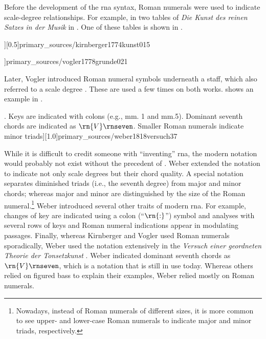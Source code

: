 
Before the development of the \gls{rna} syntax, Roman
numerals were used to indicate scale-degree relationships.
For example, in two tables of \emph{Die Kunst des reinen
Satzes in der Musik} in \textcite{kirnberger1774kunst}. One
of these tables is shown in
.

\phdfigure[Roman numerals in \textcite[p.
15]{kirnberger1774kunst}][0.5]{primary_sources/kirnberger1774kunst015}
 
\phdfigure[Roman numerals in
\textcite[Tab~XXI]{vogler1778grunde}]{primary_sources/vogler1778grunde021}

Later, Vogler introduced Roman numeral symbols underneath a
staff, which also referred to a scale degree
\parencite{vogler1778grunde, vogler1802handbuch}. These are
used a few times on both works.
 shows an
example in \textcite{vogler1778grunde}.

\phdfigure[Roman numerals in
\textcite[p.~37]{weber1818versuch}. Keys are indicated with
colons (e.g., mm. 1 and mm.5). Dominant seventh chords are
indicated as $\rn{V}\rnseven$. Smaller Roman numerals
indicate minor
triads][1.0]{primary_sources/weber1818versuch37}

While it is difficult to credit someone with ``inventing''
\gls{rna}, the modern notation would probably not exist
without the precedent of \textcite{weber1818versuch}. Weber
extended the notation to indicate not only scale degrees but
their chord quality. A special notation separates diminished
triads (i.e., the seventh degree) from major and minor
chords; whereas major and minor are distinguished by the
size of the Roman numeral.\footnote{Nowadays, instead of
Roman numerals of different sizes, it is more common to see
upper- and lower-case Roman numerals to indicate major and
minor triads, respectively.} Weber introduced several other
traits of modern \gls{rna}. For example, changes of key are
indicated using a colon (``$\rn{:}$'') symbol and analyses
with several rows of keys and Roman numeral indications
appear in modulating passages. Finally, whereas Kirnberger
and Vogler used Roman numerals sporadically, Weber used the
notation extensively in the
\emph{Versuch einer geordneten Theorie der Tonsetzkunst}
\parencite{weber1818versuch}. Weber indicated dominant
seventh chords as $\rn{V}\rnseven$, which is a notation that
is still in use today. Whereas others relied on figured bass
to explain their examples, Weber relied mostly on Roman
numerals.
